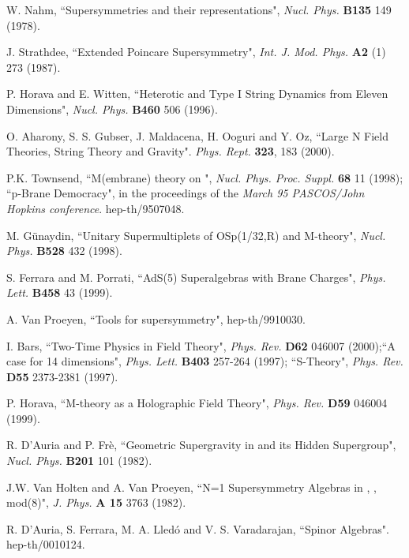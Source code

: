 \documentclass[a4paper,12pt]{article}
\begin{document}
\begin{thebibliography}{99}

  W. Nahm, ``Supersymmetries and their representations",
 {\it Nucl. Phys.} {\bf B135} 149 (1978).

 J. Strathdee, ``Extended Poincare Supersymmetry",
 {\it Int. J. Mod. Phys. } {\bf A2} (1) 273 (1987).

 P. Horava and E. Witten, ``Heterotic and Type I String Dynamics from Eleven Dimensions",
 {\it  Nucl. Phys. } {\bf B460} 506 (1996).

O. Aharony, S. S. Gubser, J. Maldacena, H. Ooguri and Y. Oz,
``Large N Field Theories, String Theory and Gravity". {\it Phys.
Rept.} {\bf 323}, 183 (2000).

 P.K. Townsend, ``M(embrane) theory on \coordHE{}",
 {\it Nucl. Phys. Proc. Suppl.} {\bf 68} 11 (1998);  ``p-Brane Democracy",
 in the proceedings of the {\it March 95 PASCOS/John
Hopkins conference}. hep-th/9507048.

 M. G\"unaydin, ``Unitary Supermultiplets of OSp(1/32,R) and M-theory",
 {\it Nucl. Phys.} {\bf B528} 432 (1998).

 S. Ferrara and M. Porrati, ``AdS(5) Superalgebras with Brane Charges",
 {\it  Phys. Lett.} {\bf B458} 43 (1999).

  A. Van Proeyen, ``Tools for supersymmetry", hep-th/9910030.

  I. Bars, ``Two-Time Physics in Field Theory",
{\it Phys. Rev.} {\bf D62} 046007 (2000);``A case for 14
dimensions", {\it Phys. Lett.} {\bf B403} 257-264 (1997);
``S-Theory", {\it Phys. Rev.} {\bf D55} 2373-2381 (1997).

 P. Horava, ``M-theory as a Holographic Field Theory",
{\it Phys. Rev.} {\bf D59} 046004 (1999).

 R. D'Auria and P. Fr\`e,
 ``Geometric Supergravity in \coordHE{} and its Hidden Supergroup",
  {\it Nucl. Phys.} {\bf B201} 101 (1982).

 J.W. Van Holten and  A. Van Proeyen,
``N=1 Supersymmetry Algebras in \coordHE{}, \coordHE{}, \coordHE{} mod(8)",
{\it J. Phys.} {\bf A 15} 3763 (1982).

 R. D'Auria, S. Ferrara,  M. A. Lled\'o and V. S. Varadarajan,
``Spinor Algebras". hep-th/0010124.


\end{thebibliography}
\end{document}
